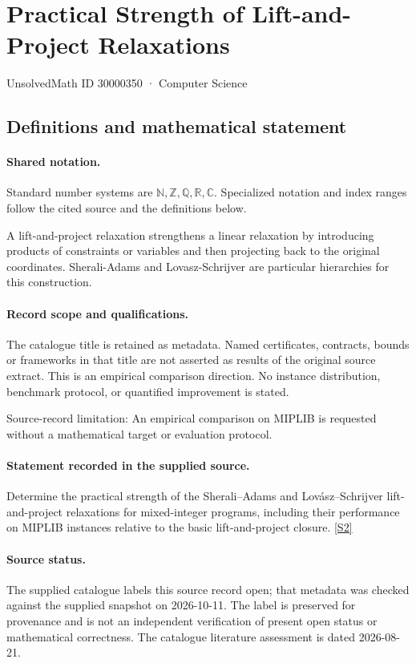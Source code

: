\documentclass[11pt]{article}
\newcommand{\sref}[2]{\hyperlink{source:#1:#2}{[S#2]}}
\begin{document}
\setcounter{section}{30000349}
\section{Practical Strength of Lift-and-Project Relaxations}\label{30000350}
{\small\sffamily UnsolvedMath ID 30000350 · Computer Science}
\subsection{Definitions and mathematical statement}

\paragraph{Shared notation.}Standard number systems are $\mathbb N,\mathbb Z,\mathbb Q,\mathbb R,\mathbb C$. Specialized notation and index ranges follow the cited source and the definitions below.


A lift-and-project relaxation strengthens a linear relaxation by introducing products of constraints or variables and then projecting back to the original coordinates. Sherali-Adams and Lovasz-Schrijver are particular hierarchies for this construction.
\paragraph{Record scope and qualifications.}
The catalogue title is retained as metadata. Named certificates, contracts, bounds or frameworks in that title are not asserted as results of the original source extract.
This is an empirical comparison direction. No instance distribution, benchmark protocol, or quantified improvement is stated.

Source-record limitation: An empirical comparison on MIPLIB is requested without a mathematical target or evaluation protocol.
\paragraph{Statement recorded in the supplied source.}
Determine the practical strength of the Sherali–Adams and Lovász–Schrijver lift-and-project relaxations for mixed-integer programs, including their performance on MIPLIB instances relative to the basic lift-and-project closure. \sref{30000350}{2}
\paragraph{Source status.}
The supplied catalogue labels this source record open; that metadata was checked against the supplied snapshot on 2026-10-11. The label is preserved for provenance and is not an independent verification of present open status or mathematical correctness. The catalogue literature assessment is dated 2026-08-21.
\end{document}
